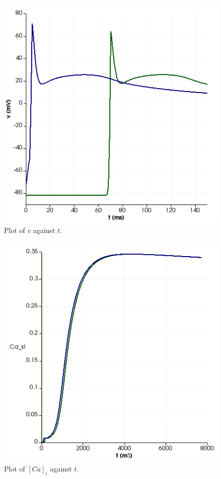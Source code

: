 \documentclass[12pt,a4paper]{article}
\begin{document}

\begin{figure}
   \includegraphics[width=1\linewidth]{v150} 
    \caption{Plot of $v$ against $t$.}
    \label{fig:3}
\end{figure}

\begin{figure}
   \includegraphics[width=1\linewidth]{Casl8000} 
    \caption{Plot of $[Ca]_i$ against $t$.}
    \label{fig:4}
\end{figure}
\end{document}
